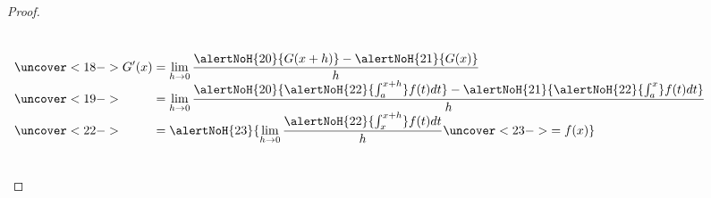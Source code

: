 \begin{frame}
\begin{proof}[Proof]
\begin{columns}
{\[
\begin{array}{l}
\uncover<18->{\displaystyle G'(x)=\lim\limits_{h\to 0}\frac{ \alertNoH{20}{ G(x+h)} -\alertNoH{21}{G(x)}}{h} }\\
\uncover<19->{\displaystyle \phantom{ G'(x) }= \lim\limits_{h\to 0}  \frac{ \alertNoH{20}{ \alertNoH{22}{\int_{a}^{x+h}} f(t)dt} - \alertNoH{21}{ \alertNoH{22}{\int_{a}^{x}} f(t)dt}}{h} }\\
\uncover<22->{\displaystyle \phantom{ G'(x) }= \alertNoH{23}{\lim\limits_{h\to 0}\frac{\alertNoH{22}{\int_{x}^{x+h}}f(t)dt }{h} \uncover<23->{=f(x)}}}
\end{array}
\]

}
\end{columns}
\end{proof}
\end{frame}
